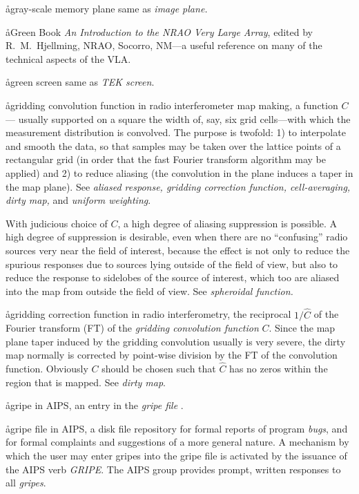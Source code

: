 \aa{gray-scale memory plane} same as {\it image plane.}

\aa{Green Book}
{\it An Introduction to the NRAO Very Large Array},
edited by R.~M.~Hjellming, NRAO, Socorro, NM---a useful
reference on many of the technical aspects of the VLA.

\aa{green screen} same as {\it TEK screen}.

\aa{gridding convolution function}
in radio interferometer map making, a function $C$---%
usually supported on a square the width of, say,
six \uv grid cells---with which the \uv measurement distribution
is convolved.
The purpose is twofold: 1) to interpolate and smooth the data, so that
samples may be taken over the lattice points of a rectangular grid
(in order that the fast Fourier transform algorithm may be applied)
and 2) to reduce aliasing (the convolution in the \uv
plane induces a taper in the map plane).
See {\it aliased response, gridding correction function, cell-averaging,
dirty map,} and {\it uniform weighting}.
\par
With judicious choice of $C$, a high degree of aliasing
suppression is possible.
A high degree of suppression is desirable, even when there
are no ``confusing'' radio sources very near the field of interest,
because the effect is not only to reduce the spurious responses due to
sources lying outside of the field of view, but also to
reduce the response to sidelobes of the source of
interest, which too are aliased into the map from outside the
field of view.
See {\it spheroidal function.}

\aa{gridding correction function}
in radio interferometry,
the reciprocal $1/\hat C$ of the Fourier transform (FT)
of the {\it gridding convolution function} $C$.
Since the map plane taper induced by the gridding convolution
usually is very severe, the dirty map normally is corrected
by point-wise division by the FT of the convolution function.
Obviously $C$ should be chosen such that $\hat C$ has no zeros
within the region that is mapped.
See {\it dirty map}.

\aa{gripe}
in AIPS, an entry in the {\it gripe file} \qv.

\aa{gripe file}
in AIPS, a disk file repository for formal reports
of program {\it bugs}, and for formal complaints and
suggestions of a more general nature.
A mechanism by which the user may enter gripes into the gripe file
is activated by the issuance of the AIPS verb {\sl GRIPE}.
The AIPS group provides prompt, written responses to all {\it gripes}.


